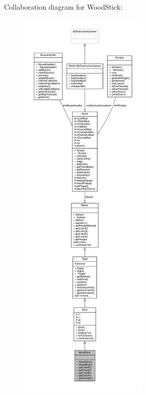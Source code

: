Collaboration diagram for Wood\+Stick\+:\nopagebreak
\begin{figure}[H]
\begin{center}
\leavevmode
\includegraphics[height=550pt]{classWoodStick__coll__graph}
\end{center}
\end{figure}
